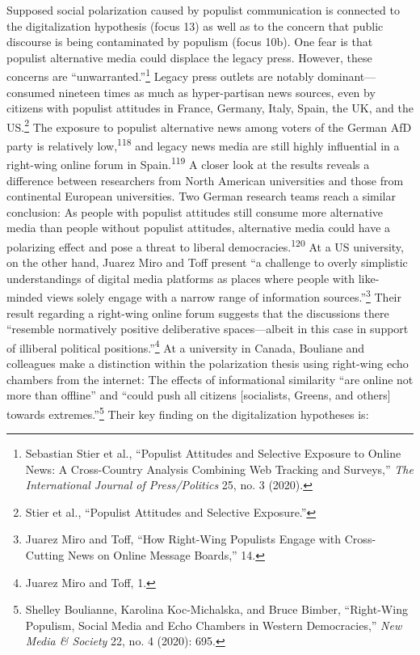 \documentclass{tufte-handout}
\begin{document}
{{Supposed social polarization caused by populist communication is
connected to the digitalization hypothesis (focus 13) as well as to the
concern that public discourse is being contaminated by populism (focus
10b). One fear is that populist alternative media could displace the
legacy press. However, these concerns are ``unwarranted.''\footnote{Sebastian
  Stier et al., ``Populist Attitudes and Selective Exposure to Online
  News: A Cross-Country Analysis Combining Web Tracking and Surveys,''
  \emph{The International Journal of Press/Politics} 25, no. 3 (2020).}
Legacy press outlets are notably dominant---consumed nineteen times as
much as hyper-partisan news sources, even by citizens with populist
attitudes in France, Germany, Italy, Spain, the UK, and the
US.\footnote{Stier et al., ``Populist Attitudes and Selective
  Exposure.''} The exposure to populist alternative news among voters of
the German AfD party is relatively low,\textsuperscript{118} and
legacy news media are still highly influential in a right-wing online
forum in Spain.\textsuperscript{119}
A closer look at the results reveals a difference between researchers
from North American universities and those from continental European
universities. Two German research teams reach a similar conclusion: As
people with populist attitudes still consume more alternative media than
people without populist attitudes, alternative media could have a
polarizing effect and pose a threat to liberal democracies.\textsuperscript{120} At a US university, on the other hand, Juarez Miro
and Toff present ``a challenge to overly simplistic understandings of
digital media platforms as places where people with like-minded views
solely engage with a narrow range of information sources.''\footnote{Juarez
  Miro and Toff, ``How Right-Wing Populists Engage with Cross-Cutting
  News on Online Message Boards,'' 14.} Their result regarding a
right-wing online forum suggests that the discussions there ``resemble
normatively positive deliberative spaces---albeit in this case in
support of illiberal political positions.''\footnote{Juarez Miro and
  Toff, 1.} At a university in Canada, Bouliane and colleagues make a
distinction within the polarization thesis using right-wing echo
chambers from the internet: The effects of informational similarity
``are online not more than offline'' and ``could push all citizens
{[}socialists, Greens, and others{]} towards extremes.''\footnote{Shelley
  Boulianne, Karolina Koc-Michalska, and Bruce Bimber, ``Right-Wing
  Populism, Social Media and Echo Chambers in Western Democracies,''
  \emph{New Media \& Society} 22, no. 4 (2020): 695.} Their key finding
on the digitalization hypotheses is:

}}
\end{document}
